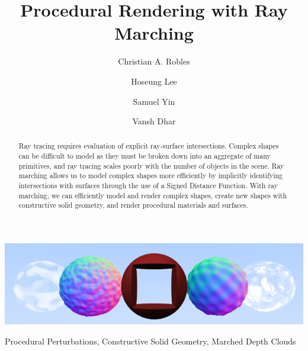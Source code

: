 \documentclass[sigconf, nonacm]{acmart}
\begin{document}
\title{Procedural Rendering with Ray Marching}

\author{Christian A. Robles}

\author{Hoseung Lee}

\author{Samuel Yin}

\author{Vansh Dhar}

\renewcommand{\shortauthors}{}

\begin{abstract}
Ray tracing requires evaluation of explicit ray-surface intersections. Complex shapes can be difficult to model as they must be broken down into an aggregate of many primitives, and ray tracing scales poorly with the number of objects in the scene. Ray marching allows us to model complex shapes more efficiently by implicitly identifying intersections with surfaces through the use of a Signed Distance Function. With ray marching, we can efficiently model and render complex shapes, create new shapes with constructive solid geometry, and render procedural materials and surfaces.
\end{abstract}

\begin{teaserfigure}
  \includegraphics[width=\textwidth]{images/teaser.png}
  \caption{Procedural Perturbations, Constructive Solid Geometry, Marched Depth Clouds}
  \label{fig:teaser}
\end{teaserfigure}
\end{document}
